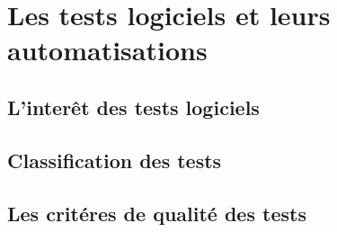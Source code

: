 \chapter{Les tests logiciels et leurs automatisations }

\section{L'interêt des tests logiciels}
\label{sec:interet}
\section{Classification des tests}
\label{sec:classification}
\section{Les critéres de qualité des tests}
\label{sec:criteres}


